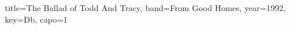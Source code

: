 \documentclass{skrul-leadsheet}
\begin{document}
\begin{song}[transpose-capo=true]{title={The Ballad of Todd And Tracy}, band={From Good Homes}, year={1992}, key={Db}, capo={1}}



\end{song}
\end{document}
